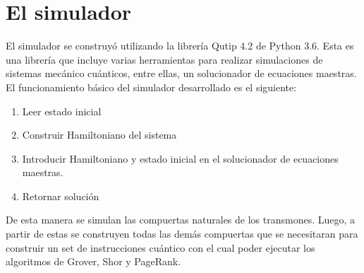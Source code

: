 \chapter{El simulador}

El simulador se construyó utilizando la librería Qutip 4.2 de Python 3.6. Esta es una librería que incluye varias herramientas para realizar simulaciones de sistemas mecánico cuánticos, entre ellas, un solucionador de ecuaciones maestras. El funcionamiento básico del simulador desarrollado es el siguiente:

\begin{enumerate}
    \item Leer estado inicial
    \item Construir Hamiltoniano del sistema
    \item Introducir Hamiltoniano y estado inicial en el solucionador de ecuaciones maestras.
    \item Retornar solución
\end{enumerate}

De esta manera se simulan las compuertas naturales de los transmones. Luego, a partir de estas se construyen todas las demás compuertas que se necesitaran para construir un set de instrucciones cuántico con el cual poder ejecutar los algoritmos de Grover, Shor y PageRank.


